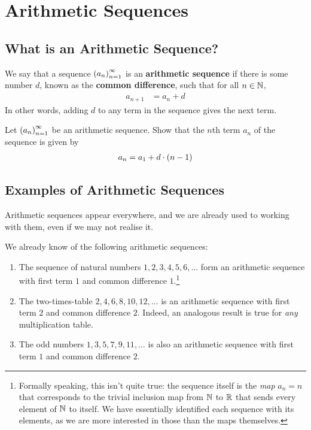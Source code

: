 \section{Arithmetic Sequences}

\subsection{What is an Arithmetic Sequence?}

\begin{definition}
    We say that a sequence $\left( a_n \right)_{n=1}^{\infty}$ is an \textbf{arithmetic sequence} if there is some number $d$, known as the \textbf{common difference}, such that for all $n \in \mathbb{N}$,
    \begin{align}
        a_{n+1} &= a_n + d
    \end{align}
    In other words, adding $d$ to any term in the sequence gives the next term.
\end{definition}

\begin{boxexercise}
Let $\left( a_n \right)_{n=1}^{\infty}$ be an arithmetic sequence. Show that the $n$th term $a_n$ of the sequence is given by
\begin{align}
    a_n = a_1 + d \cdot \left( n - 1 \right) \label{eq:AS_nth_term}
\end{align}
\end{boxexercise}

\subsection{Examples of Arithmetic Sequences}

Arithmetic sequences appear everywhere, and we are already used to working with them, even if we may not realise it.

\begin{example}
We already know of the following arithmetic sequences:
\begin{enumerate}[noitemsep]
    \item The sequence of natural numbers $1,2,3,4,5,6,\ldots$ form an arithmetic sequence with first term $1$ and common difference $1$.\footnote{Formally speaking, this isn't quite true: the sequence itself is the \textit{map} $a_n = n$ that corresponds to the trivial inclusion map from $\mathbb{N}$ to $\mathbb{R}$ that sends every element of $\mathbb{N}$ to itself. We have essentially identified each sequence with its elements, as we are more interested in those than the maps themselves.}
    \item The two-times-table $2, 4, 6, 8, 10, 12, \ldots$ is an arithmetic sequence with first term $2$ and common difference $2$. Indeed, an analogous result is true for \textit{any} multiplication table.
    \item The odd numbers $1, 3, 5, 7, 9, 11, \ldots$ is also an arithmetic sequence with first term $1$ and common difference $2$.
\end{enumerate}
\end{example}

